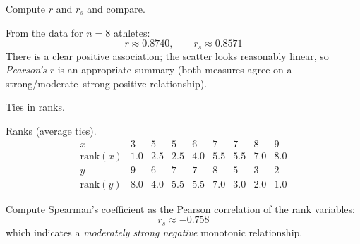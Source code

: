\documentclass[11pt]{article}
\def\textbf#1{#1}%
\def\textit#1{#1}%
\begin{document}
\begin{solution}
\textbf{Compute $r$ and $r_s$ and compare.}

From the data for $n=8$ athletes:
\[
\boxed{\,r \approx 0.8740,\qquad r_s \approx 0.8571\,}
\]
There is a clear positive association; the scatter looks reasonably linear, so \emph{Pearson’s $r$} is an appropriate summary (both measures agree on a strong/moderate–strong positive relationship).

\begin{center}
\end{center}
\end{solution}

\begin{solution}
\textbf{Ties in ranks.}

\textit{Ranks (average ties).}
\[
\begin{array}{c|cccccccc}
x & 3 & 5 & 5 & 6 & 7 & 7 & 8 & 9\\
\text{rank}(x) & 1.0 & 2.5 & 2.5 & 4.0 & 5.5 & 5.5 & 7.0 & 8.0\\
\hline
y & 9 & 6 & 7 & 7 & 8 & 5 & 3 & 2\\
\text{rank}(y) & 8.0 & 4.0 & 5.5 & 5.5 & 7.0 & 3.0 & 2.0 & 1.0
\end{array}
\]

Compute Spearman’s coefficient as the Pearson correlation of the rank variables:
\[
\boxed{\,r_s \approx -0.758\,}
\]
which indicates a \emph{moderately strong negative} monotonic relationship.

\begin{center}
\end{center}
\end{solution}
\end{document}
